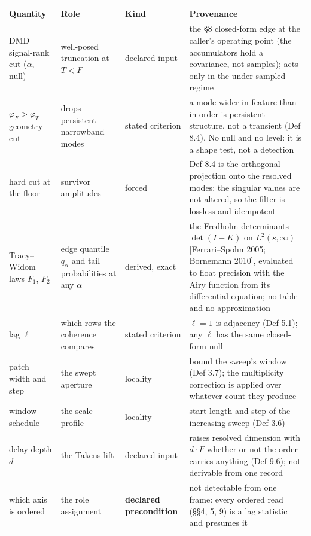 \documentclass[10pt,letterpaper,twocolumn]{article}
\begin{document}
\begin{table}[tp]
\centering\footnotesize
\begin{tabular}{L{0.239\textwidth}L{0.108\textwidth}L{0.173\textwidth}L{0.413\textwidth}}
\toprule
Quantity & Role & Kind & Provenance \\
\midrule
DMD signal-rank cut (\(\alpha\), null) & well-posed truncation at \(T<F\) & declared input & the §8 closed-form edge at the caller's operating point (the
accumulators hold a covariance, not samples); acts only in the
under-sampled regime \\
\(\varphi_F>\varphi_T\) geometry cut & drops persistent narrowband modes & stated criterion & a mode wider in feature than in order is persistent structure, not a
transient (Def 8.4). No null and no level: it is a shape test, not a
detection \\
hard cut at the floor & survivor amplitudes & forced & Def 8.4 is the orthogonal projection onto the resolved modes: the
singular values are not altered, so the filter is lossless and
idempotent \\
Tracy--Widom laws \(F_1\), \(F_2\) & edge quantile \(q_\alpha\) and tail probabilities at any \(\alpha\) & derived, exact & the Fredholm determinants \(\det(I-K)\) on \(L^2(s,\infty)\)
{[}Ferrari--Spohn 2005; Bornemann 2010{]}, evaluated to float precision
with the Airy function from its differential equation; no table and no
approximation \\
lag \(\ell\) & which rows the coherence compares & stated criterion & \(\ell=1\) is adjacency (Def 5.1); any \(\ell\) has the same closed-form
null \\
patch width and step & the swept aperture & locality & bound the sweep's window (Def 3.7); the multiplicity correction is
applied over whatever count they produce \\
window schedule & the scale profile & locality & start length and step of the increasing sweep (Def 3.6) \\
delay depth \(d\) & the Takens lift & declared input & raises resolved dimension with \(d\cdot F\) whether or not the order
carries anything (Def 9.6); not derivable from one record \\
which axis is ordered & the role assignment & \textbf{declared precondition} & not detectable from one frame: every ordered read (§§4, 5, 9) is a lag
statistic and presumes it \\
\bottomrule
\end{tabular}
\end{table}
\end{document}
